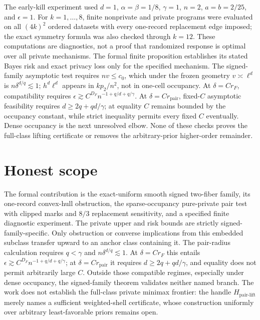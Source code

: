\documentclass{article}
\begin{document}
The early-kill experiment used \(d=1\), \(\alpha=\beta=1/8\), \(\gamma=1\), \(n=2\), \(a=b=2/25\), and \(\epsilon=1\). For \(k=1,\ldots,8\), finite nonprivate and private programs were evaluated on all \((4k)^2\) ordered datasets with every one-record replacement edge imposed; the exact symmetry formula was also checked through \(k=12\). These computations are diagnostics, not a proof that randomized response is optimal over all private mechanisms. The formal finite proposition establishes its stated Bayes risk and exact privacy loss only for the specified mechanism. The signed-family asymptotic test requires \(nv\le c_0\), which under the frozen geometry \(v\asymp\ell^d\) is \(n\delta^{d/q}\lesssim1\); \(h^d\ell^d\) appears in \(kp_2/n^2\), not in one-cell occupancy. At \(\delta=Cr_F\), compatibility requires \(\epsilon\gtrsim C^{D_F}n^{-1+q/d+q/\gamma}\). At \(\delta=Cr_{\mathrm{pair}}\), fixed-\(C\) asymptotic feasibility requires \(d\ge2q+qd/\gamma\); at equality \(C\) remains bounded by the occupancy constant, while strict inequality permits every fixed \(C\) eventually. Dense occupancy is the next unresolved elbow. None of these checks proves the full-class lifting certificate or removes the arbitrary-prior higher-order remainder.

\section{Honest scope}

The formal contribution is the exact-uniform smooth signed two-fiber family, its one-record convex-hull obstruction, the sparse-occupancy pure-private pair test with clipped marks and \(8/3\) replacement sensitivity, and a specified finite diagnostic experiment. The private upper and risk bounds are strictly signed-family-specific. Only obstruction or converse implications from this embedded subclass transfer upward to an anchor class containing it. The pair-radius calculation requires \(q<\gamma\) and \(n\delta^{d/q}\lesssim1\). At \(\delta=Cr_F\) this entails \(\epsilon\gtrsim C^{D_F}n^{-1+q/d+q/\gamma}\); at \(\delta=Cr_{\mathrm{pair}}\) it requires \(d\ge2q+qd/\gamma\), and equality does not permit arbitrarily large \(C\). Outside those compatible regimes, especially under dense occupancy, the signed-family theorem validates neither named branch. The work does not establish the full-class private minimax frontier: the handle \(H_{\mathrm{pair\mbox{-}lift}}\) merely names a sufficient weighted-shell certificate, whose construction uniformly over arbitrary least-favorable priors remains open.
\end{document}
